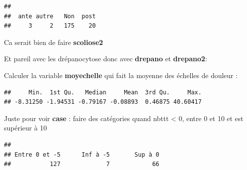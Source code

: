 \documentclass[
]{book}
\begin{document}
\begin{verbatim}
## 
##  ante autre   Non  post 
##     3     2   175    20
\end{verbatim}

Ca serait bien de faire \textbf{scoliose2}

Et pareil avec les drépanocytose donc avec \textbf{drepano} et \textbf{drepano2}:

Calculer la variable \textbf{moyechelle} qui fait la moyenne des échelles de douleur :

\begin{verbatim}
##     Min.  1st Qu.   Median     Mean  3rd Qu.     Max. 
## -8.31250 -1.94531 -0.79167 -0.08893  0.46875 40.60417
\end{verbatim}

Juste pour voir \textbf{case} : faire des catégories quand nbttt \textless{} 0, entre 0 et 10
et est supérieur à 10

\begin{verbatim}
## 
## Entre 0 et -5      Inf à -5       Sup à 0 
##           127             7            66
\end{verbatim}

  
\end{document}
